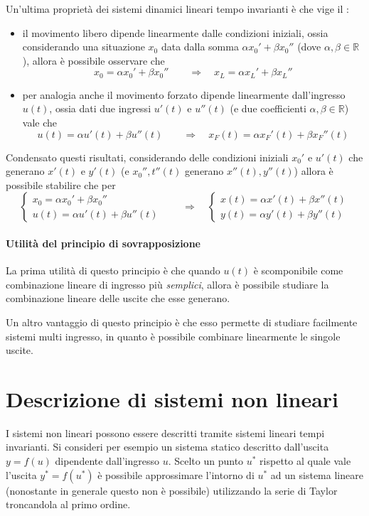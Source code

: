  		Un'ultima proprietà dei sistemi dinamici lineari tempo invarianti è che vige il :
 		\begin{itemize}
 			\item il movimento libero dipende linearmente dalle condizioni iniziali, ossia considerando una situazione $x_0$ data dalla somma $\alpha x_0'+ \beta x_0''$ (dove $\alpha,\beta\in \mathds R$), allora è possibile osservare che
 			\[ x_0 = \alpha x_0'+ \beta x_0'' \qquad \Rightarrow \quad x_L = \alpha x_L' + \beta x_L''\]
 			
 			\item per analogia anche il movimento forzato dipende linearmente dall'ingresso $u(t)$, ossia dati due ingressi $u'(t)$ e $u''(t)$ (e due coefficienti $\alpha, \beta \in \mathds R$) vale che
 			\[ u(t) = \alpha u'(t) + \beta u''(t) \qquad \Rightarrow \quad x_F(t) = \alpha x_F'(t) + \beta x_F''(t)\]
 			
 		\end{itemize}
 		Condensato questi risultati, considerando delle condizioni iniziali $x_0'$ e $u'(t)$ che generano $x'(t)$ e $y'(t)$ (e $x_0'', t''(t)$ generano $x''(t), y''(t)$) allora è possibile stabilire che per
 		\[ \begin{cases}
 			x_0 = \alpha x_0' + \beta x_0'' \\ u(t) = \alpha u'(t) + \beta u''(t) 
 		\end{cases} \qquad \Rightarrow \quad \begin{cases}
 			x(t)= \alpha x'(t) + \beta x''(t) \\
 			y(t) = \alpha y'(t) + \beta y''(t)
 		\end{cases} \]
 	
 		\paragraph{Utilità del principio di sovrapposizione} La prima utilità di questo principio è che quando $u(t)$ è scomponibile come combinazione lineare di ingresso più \textit{semplici}, allora è possibile studiare la combinazione lineare delle uscite che esse generano.
 		
 		Un altro vantaggio di questo principio è che esso permette di studiare facilmente sistemi multi ingresso, in quanto è possibile combinare linearmente le singole uscite.
 		
 \section{Descrizione di sistemi non lineari}
 	I sistemi non lineari possono essere descritti tramite sistemi lineari tempi invarianti. Si consideri per esempio un sistema statico descritto dall'uscita $y=f(u)$ dipendente dall'ingresso $u$. Scelto un punto $u^*$ rispetto al quale vale l'uscita $y^* = f(u^*)$ è possibile approssimare l'intorno di $u^*$ ad un sistema lineare (nonostante in generale questo non è possibile) utilizzando la serie di Taylor troncandola al primo ordine.
 	
